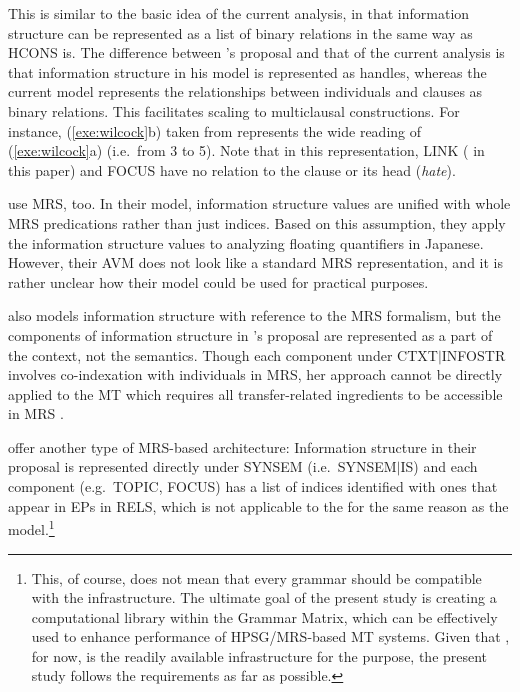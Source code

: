 \noindent This is similar to the basic idea of the current analysis,
in that information structure can be represented as a list of binary
relations in the same way as HCONS is. The
difference between \citeauthor{wilcock:05}'s proposal and that of the
current analysis is that information structure in his model is
represented as handles, whereas the current model represents the
relationships between individuals and clauses as binary
relations. This facilitates scaling to multiclausal constructions. For
instance, (\ref{exe:wilcock}b) taken from \citet[275]{wilcock:05}
represents the wide  reading of (\ref{exe:wilcock}a)
(i.e.\ from 3 to 5). Note that in this representation, LINK
( in this paper) and FOCUS have no relation to the clause
or its head (\textit{hate}).





\citet{yoshimoto:etal:06} use MRS, too. In their model,
information structure values are unified with whole MRS predications
rather than just indices. Based on this assumption, they apply the
information structure values to analyzing floating quantifiers in
Japanese.  However, their AVM does not look like a standard MRS
representation, and it is rather unclear how their model could be used
for practical purposes.



\citet{paggio:09} also models information structure with reference to
the MRS formalism, but the components of information structure in
\citeauthor{paggio:09}'s proposal are represented as a part of the
context, not the semantics. Though each component under
CTXT\ensuremath{\mid}INFOSTR involves co-indexation with individuals
in MRS, her approach cannot be directly applied to the \isi{\logon} MT
 which requires all transfer-related ingredients
to be accessible in MRS \citep{oepen:etal:07}.


\largerpage[-2]
\citet{bildhauer:cook:10} offer another type of MRS-based
architecture: Information structure in their proposal is
represented directly under SYNSEM (i.e.\ SYNSEM\ensuremath{\mid}IS)
and each component (e.g.\ TOPIC, FOCUS) has a list of indices
identified with ones that appear in EPs in RELS, which is not
applicable to the \isi{\logon}  for the same
reason as the \citet{paggio:09} model.\footnote{This, of course, does
  not mean that every grammar should be compatible with the
  \isi{\logon} infrastructure. The ultimate goal of the present study
  is creating a computational library within the Grammar Matrix, which
  can be effectively used to enhance performance of HPSG/MRS-based MT
  systems. Given that \isi{\logon}, for now, is the readily available
  infrastructure for the purpose, the present study follows the
  requirements as far as possible.}



